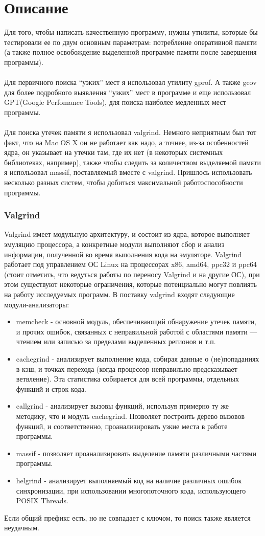 \documentclass[pdf, unicode, 12pt, a4paper,oneside,fleqn]{article}
\begin{document}
\section{Описание}
Для того, чтобы написать качественную программу, нужны утилиты, которые бы тестировали ее по двум основным параметрам: потребление оперативной памяти (а также полное освобождение выделенной программе памяти после завершения программы).\\\\
Для первичного поиска \enquote{узких}  мест я использовал утилиту gprof. А также gcov для более подробного выявления \enquote{узких} мест в программе  и еще использовал GPT(Google Perfomance Tools), для поиска наиболее медленных мест программы.\\\\
Для поиска утечек памяти я использовал valgrind. Немного неприятным был тот факт, что на Mac OS X он не работает как надо, а точнее, из-за особенностей ядра, он указывает на утечки там, где их нет (в некоторых системных библиотеках, например), также чтобы следить за количеством выделяемой памяти я использовал massif, поставляемый вместе с valgrind. Пришлось использовать несколько разных систем, чтобы добиться максимальной работоспособности программы.
\newpage
\setcounter{subsection}{1}
\subsubsection{Valgrind}
Valgrind имеет модульную архитектуру, и состоит из ядра, которое выполняет эмуляцию процессора, а конкретные модули выполняют сбор и анализ информации, полученной во время выполнения кода на эмуляторе. Valgrind работает под управлением ОС Linux на процессорах x86, amd64, ppc32 и ppc64 (стоит отметить, что ведуться работы по переносу Valgrind и на другие ОС), при этом существуют некоторые ограничения, которые потенциально могут повлиять на работу исследуемых программ.
В поставку valgrind входят следующие модули-анализаторы:
 \begin{itemize}
\item memcheck - основной модуль, обеспечивающий обнаружение утечек памяти, и прочих ошибок, связанных с неправильной работой с областями памяти — чтением или записью за пределами выделенных регионов и т.п.
\item cachegrind - анализирует выполнение кода, собирая данные о (не)попаданиях в кэш, и точках перехода (когда процессор неправильно предсказывает ветвление). Эта статистика собирается для всей программы, отдельных функций и строк кода.
\item callgrind - анализирует вызовы функций, используя примерно ту же методику, что и модуль cachegrind. Позволяет построить дерево вызовов функций, и соответственно, проанализировать узкие места в работе программы.
\item massif - позволяет проанализировать выделение памяти различными частями программы.
\item helgrind - анализирует выполняемый код на наличие различных ошибок синхронизации, при использовании многопоточного кода, использующего POSIX Threads.
\end{itemize}
Если общий префикс есть, но не совпадает с ключом, то поиск также является неудачным.
\newpage
\end{document}
